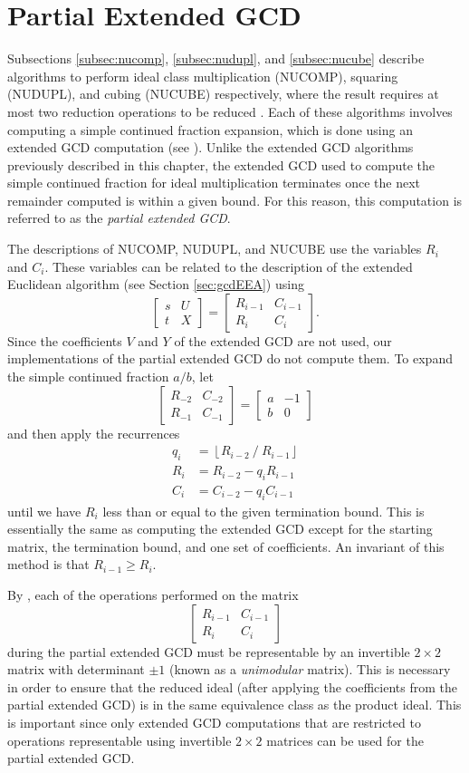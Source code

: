 \documentclass{ucalgthes1}
\theoremstyle{definition}
\newcommand{\matrixtt}[4]{\left[ \begin{array}{rr} #1 & #2 \\ #3 & #4 \end{array} \right]}
\newcommand{\floor}[1]{\left\lfloor #1 \right\rfloor}
\begin{document}
\section{Partial Extended GCD}
\label{sec:gcdPartial}

Subsections \ref{subsec:nucomp}, \ref{subsec:nudupl}, and \ref{subsec:nucube} describe algorithms to perform ideal class multiplication (NUCOMP), squaring (NUDUPL), and cubing (NUCUBE) respectively, where the result requires at most two reduction operations to be reduced \cite[p.122]{Jacobson2009}.  Each of these algorithms involves computing a simple continued fraction expansion, which is done using an extended GCD computation (see \cite[\S 3.2]{Jacobson2009}).  Unlike the extended GCD algorithms previously described in this chapter, the extended GCD used to compute the simple continued fraction for ideal multiplication terminates once the next remainder computed is within a given bound.  For this reason, this computation is referred to as the \emph{partial extended GCD}.

The descriptions of NUCOMP, NUDUPL, and NUCUBE use the variables $R_i$ and $C_i$.  These variables can be related to the description of the extended Euclidean algorithm (see Section \ref{sec:gcdEEA}) using
\[
	\matrixtt{s}{U}{t}{X} = \matrixtt{R_{i-1}}{C_{i-1}}{R_i}{C_i}.
\]
Since the coefficients $V$ and $Y$ of the extended GCD are not used, our implementations of the partial extended GCD do not compute them.
To expand the simple continued fraction $a/b$, let
\[
\matrixtt{R_{-2}}{C_{-2}}{R_{-1}}{C_{-1}} = \matrixtt{a}{-1}{b}{0}
\]
and then apply the recurrences
\begin{align*}
	q_i &= \floor{R_{i-2} ~/~ R_{i-1}} \\
	R_i &= R_{i-2} - q_i R_{i-1} \\
	C_i &= C_{i-2} - q_i C_{i-1}
\end{align*}
until we have $R_i$ less than or equal to the given termination bound.  This is essentially the same as computing the extended GCD except for the starting matrix, the termination bound, and one set of coefficients.  An invariant of this method is that $R_{i-1} \ge R_i$.

By \cite[\S 5.6.1]{Crandall2001}, each of the operations performed on the matrix
\[
\matrixtt{R_{i-1}}{C_{i-1}}{R_i}{C_i}
\]
during the partial extended GCD must be representable by an invertible $2 \times 2$ matrix with determinant $\pm 1$ (known as a \emph{unimodular} matrix).  This is necessary in order to ensure that the reduced ideal (after applying the coefficients from the partial extended GCD) is in the same equivalence class as the product ideal.  This is important since only extended GCD computations that are restricted to operations representable using invertible $2 \times 2$ matrices can be used for the partial extended GCD.
\end{document}
